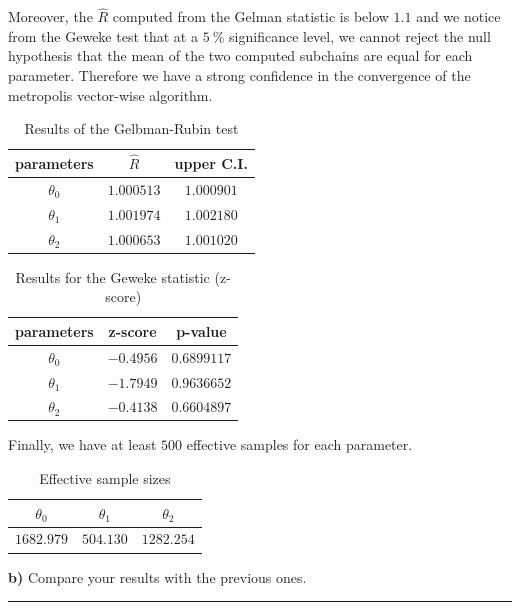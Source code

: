 Moreover, the $\hat{R}$ computed from the Gelman statistic is below $1.1$ and we notice from the Geweke test that at a $\SI{5}{\percent}$ significance level, we cannot reject the null hypothesis that the mean of the two computed subchains are equal for each parameter. Therefore we have a strong confidence in the convergence of the metropolis vector-wise algorithm.

\begin{table}[H]
	\centering\begin{tabular}{|c|c|c|} \hline 
		parameters & $\hat{R}$ & upper C.I. \\ \hline
		$\theta_0$ & $1.000513$ & $1.000901$ \\
		$\theta_1$ & $1.001974$ & $1.002180$ \\
		$\theta_2$ & $1.000653$ & $1.001020$ \\ \hline
	\end{tabular}
	\caption{Results of the Gelbman-Rubin test}
	\label{tab:metropolis-vw-gelman-rubin}
\end{table}

\begin{table}[H]
	\centering\begin{tabular}{|c|c|c|} \hline 
		parameters & z-score & p-value \\ \hline
		$\theta_0$ & $-0.4956$ & $0.6899117$ \\
		$\theta_1$ & $-1.7949$ & $0.9636652$ \\
		$\theta_2$ & $-0.4138$ & $0.6604897$ \\ \hline
	\end{tabular}
	\caption{Results for the Geweke statistic (z-score)}
	\label{tab:metropolis-vw-geweke}
\end{table}

Finally, we have at least $500$ effective samples for each parameter.

\begin{table}[H]
	\centering\begin{tabular}{|c|c|c|} \hline 
		$\theta_0$ & $\theta_1$ & $\theta_2$ \\ \hline 
		$1682.979$  & $504.130$ & $1282.254$   \\ \hline
	\end{tabular}
	\caption{Effective sample sizes}
	\label{tab:metropolis-vw-effective-sample-sizes}
\end{table}

\textbf{b)} Compare your results with the previous ones.

\begin{center}\rule{6cm}{0.4pt}\end{center}

